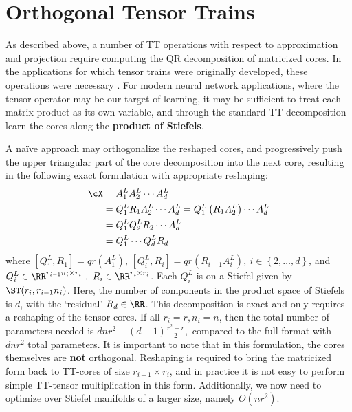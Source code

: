 \section{Orthogonal Tensor Trains}\label{sec:ott}
As described above, a number of TT operations with respect to approximation and projection require computing the QR decomposition of matricized cores. In the applications for which tensor trains were originally developed, these operations were necessary \cite{oseledets2011tensor,klus2018tensor}. For modern neural network applications, where the tensor operator may be our target of learning, it may be sufficient to treat each matrix product as its own variable, and through the standard TT decomposition learn the cores along the {\bf product of Stiefels}.

A na\"ive approach may orthogonalize the reshaped cores, and progressively push the upper triangular part of the core decomposition into the next core, resulting in the following exact formulation with appropriate reshaping:
\begin{align}
    \cX &= A_1^L A_2^L\cdots A_d^L \nonumber\\
    &= Q_1^L R_1 A_2^L \cdots A_d^L = Q_1^L \left(R_1 A_2^L\right) \cdots A_d^L \nonumber\\ 
    &= Q_1^L Q_2^L R_2 \cdots A_d^L \nonumber\\
    &= Q_1^L \cdots Q_d^L R_d \label{eq:eott}
\end{align}
where $ [Q_1^L, R_1] = qr(A_1^L) $, $ [Q_i^L, R_i] = qr(R_{i-1} A_i^L ), \ i \in \left \{2,\ldots,d \right \}$, and $ Q_i^L \in \RR^{r_{i-1} n_i \times r_i} \ ,\ R_i \in \RR^{r_i \times r_i} $. 
Each $Q_i^L$ is on a Stiefel given by $\ST(r_i, r_{i-1}n_i)$. Here, the number of components in the product space of Stiefels is $d$, with the `residual' $R_d \in \RR$. This decomposition is exact and only requires a reshaping of the tensor cores.
If all $r_i = r, n_i = n$,
then the total number of parameters needed is
$    d n r^2 - (d-1)\frac{r^2 + r}{2},$
compared to the full format with $dnr^2$ total parameters.
It is important to note that in this formulation, the cores themselves are \textbf{not} orthogonal. Reshaping is required to bring the matricized form back to TT-cores of size $r_{i-1} \times r_i$, and in practice it is not easy to perform simple TT-tensor multiplication in this form. Additionally, we now need to optimize over Stiefel manifolds of a larger size, namely $O(nr^2)$.

